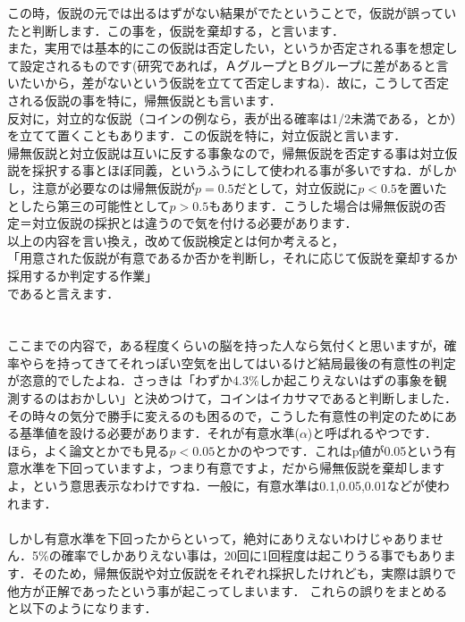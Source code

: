 \documentclass[11pt,a4paper]{ujreport} 	%
\begin{document}
この時，仮説の元では出るはずがない結果がでたということで，仮説が誤っていたと判断します．この事を，仮説を棄却する，と言います．\\

また，実用では基本的にこの仮説は否定したい，というか否定される事を想定して設定されるものです(研究であれば，ＡグループとＢグループに差があると言いたいから，差がないという仮説を立てて否定しますね)．故に，こうして否定される仮説の事を特に，帰無仮説とも言います．\\

反対に，対立的な仮説（コインの例なら，表が出る確率は1/2未満である，とか）を立てて置くこともあります．この仮説を特に，対立仮説と言います．\\

帰無仮説と対立仮説は互いに反する事象なので，帰無仮説を否定する事は対立仮説を採択する事とほぼ同義，というふうにして使われる事が多いですね．がしかし，注意が必要なのは帰無仮説が$p=0.5$だとして，対立仮説に$p<0.5$を置いたとしたら第三の可能性として$p>0.5$もあります．こうした場合は帰無仮説の否定＝対立仮説の採択とは違うので気を付ける必要があります．\\


以上の内容を言い換え，改めて仮説検定とは何か考えると，\\
「用意された仮説が有意であるか否かを判断し，それに応じて仮説を棄却するか採用するか判定する作業」\\
であると言えます．\\
\\
\\

ここまでの内容で，ある程度くらいの脳を持った人なら気付くと思いますが，確率やらを持ってきてそれっぽい空気を出してはいるけど結局最後の有意性の判定が恣意的でしたよね．さっきは「わずか4.3\%しか起こりえないはずの事象を観測するのはおかしい」と決めつけて，コインはイカサマであると判断しました．\\

その時々の気分で勝手に変えるのも困るので，こうした有意性の判定のためにある基準値を設ける必要があります．それが有意水準($\alpha$)と呼ばれるやつです．\\

ほら，よく論文とかでも見る$p<0.05$とかのやつです．これはp値が0.05という有意水準を下回っていますよ，つまり有意ですよ，だから帰無仮説を棄却しますよ，という意思表示なわけですね．一般に，有意水準は0.1,0.05,0.01などが使われます．\\
\\

しかし有意水準を下回ったからといって，絶対にありえないわけじゃありません．5\%の確率でしかありえない事は，20回に1回程度は起こりうる事でもあります．そのため，帰無仮説や対立仮説をそれぞれ採択したけれども，実際は誤りで他方が正解であったという事が起こってしまいます．
これらの誤りをまとめると以下のようになります．
\end{document}
